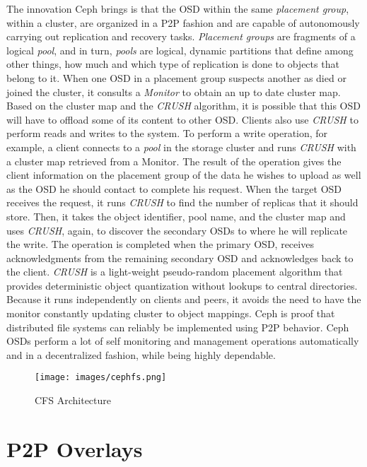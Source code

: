 \documentclass[runningheads]{llncs}
\begin{document}
The innovation Ceph brings is that the OSD within the same \textit{placement group}, within a cluster, are organized in a P2P fashion and are capable of autonomously carrying out replication and recovery tasks. \textit{Placement groups} are fragments of a logical \textit{pool}, and in turn, \textit{pools} are logical, dynamic partitions that define among other things, how much and which type of replication is done to objects that belong to it. When one OSD in a placement group suspects another as died or joined the cluster, it consults a \textit{Monitor} to obtain an up to date cluster map. Based on the cluster map and the \textit{CRUSH}\cite{crush} algorithm, it is possible that this OSD will have to offload some of its content to other OSD. Clients also use \textit{CRUSH} to perform reads and writes to the system. To perform a write operation, for example, a client connects to a \textit{pool} in the storage cluster and runs \textit{CRUSH} with a cluster map retrieved from a Monitor. The result of the operation gives the client information on the placement group of the data he wishes to upload as well as the OSD he should contact to complete his request. When the target OSD receives the request, it runs \textit{CRUSH} to find the number of replicas that it should store. Then, it takes the object identifier, pool name, and the cluster map and uses \textit{CRUSH}, again, to discover the secondary OSDs to where he will replicate the write. The operation is completed when the primary OSD, receives acknowledgments from the remaining secondary OSD and acknowledges back to the client. \textit{CRUSH} is a light-weight pseudo-random placement algorithm that provides deterministic object quantization without lookups to central directories. Because it runs independently on clients and peers, it avoids the need to have the monitor constantly updating cluster to object mappings. Ceph is proof that distributed file systems can reliably be implemented using P2P behavior. Ceph OSDs perform a lot of self monitoring and management operations automatically and in a decentralized fashion, while being highly dependable. \cite{ceph, ceph_benchmarks}

\begin{figure}[!ht]
\centering
\texttt{[image: images/cephfs.png]}
\caption{CFS Architecture \cite{configure-ceph}}
\label{fig:cfs_arch}
\end{figure}

\newpage\section{P2P Overlays}\label{sec:p2p-overlays}
\end{document}

